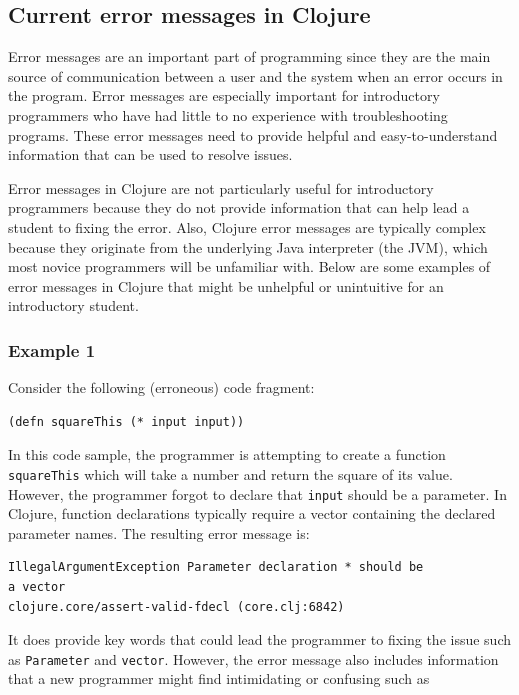 \documentclass[12pt]{article}
\newcommand{\comment}[1]{{\bf \tt  {#1}}}
\newcommand{\emcomment}[1]{\textcolor{ForestGreen}{\comment{Elena: {#1}}}}
\begin{document}
\subsection{Current error messages in Clojure}\label{sec:currentem}
Error messages are an important part of programming since they are the main source of communication between a user and the system when an error occurs in the program.
Error messages are especially important for introductory programmers who have had little to no experience with troubleshooting programs. %
These error messages need to provide helpful and easy-to-understand information that can be used to resolve issues.

Error messages in Clojure are not particularly useful for introductory programmers because they do not provide information that can help lead a student to fixing the error.
Also, Clojure error messages are typically complex because they originate from the underlying Java interpreter (the JVM), which most %
novice programmers will be unfamiliar with.
Below are some examples of error messages in Clojure that might be unhelpful or unintuitive for an introductory student.

\subsubsection{Example 1}\label{sec:ex1}

Consider the following (erroneous) code fragment:
\begin{verbatim}
(defn squareThis (* input input))
\end{verbatim}

In this code sample, the programmer is attempting to create a function \texttt{squareThis} which will take a number and return the square of its value.
However, the programmer forgot to declare that \texttt{input} should be a parameter.
In Clojure, function declarations typically require a vector containing the declared parameter names.
The resulting error message is: 
\begin{verbatim}
IllegalArgumentException Parameter declaration * should be 
a vector 
clojure.core/assert-valid-fdecl (core.clj:6842)
\end{verbatim}
It does provide key words that could lead the programmer to fixing the issue such as \texttt{Parameter} and \texttt{vector}.
However, the error message also includes information that a new programmer might find intimidating or confusing such as 
\end{document}

